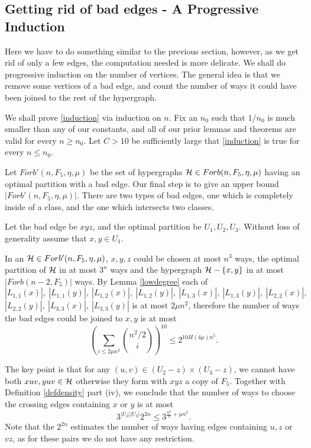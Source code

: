 \documentclass[11pt]{article}
\begin{document}
\subsection{Getting rid of bad edges - A Progressive Induction}

Here we have to do something similar to  the previous section,
however, as we get rid of only a few edges, the computation needed
is more delicate. We shall do progressive induction on the number of
vertices. The general idea is that we remove some vertices of a bad
edge, and count the number of ways it could
 have been joined to the rest of the hypergraph.

 We shall prove \eqref{induction} via induction on $n$. Fix an $n_0$
such that $1/n_0$ is much smaller than any of our constants, and all
of our prior lemmas and theorems are valid for every $n\ge n_0$. Let $C>10$ be
sufficiently large that \eqref{induction} is true for every $n\le
n_0$.


Let $Forb'(n, F_5, \eta, \mu)$ be the set of hypergraphs $\mathcal{H} \in
Forb(n,F_5,\eta,\mu)$ having an optimal partition with a bad edge.
Our  final step is to give an  upper bound $|Forb'(n, F_5, \eta,
\mu)|$. There are two types of bad edges, one which is completely
inside of a class, and the one which intersects two classes.

Let the bad edge be $xyz$, and the optimal partition be $U_1,U_2,U_3$.  Without loss of generality assume that
$x,y\in U_1$.

In an $\mathcal{H} \in Forb'(n,F_5,\eta,\mu)$, $x,y,z$ could be chosen at
most $n^3$ ways, the optimal partition of $\mathcal{H}$ in at most $3^n$ ways and
the hypergraph $\mathcal{H}-\{x,y\}$ in at most $|Forb(n-2,F_5)|$ ways. By Lemma \ref{lowdegree} each of $|L_{1,1}(x)|,\ |L_{1,1}(y)|,\
|L_{1,2}(x)|,\ |L_{1,2}(y)|,\ |L_{1,3}(x)|,\ |L_{1,3}(y)|,\
|L_{2,2}(x)|,$ $ |L_{2,2}(y)|,\ |L_{3,3}(x)|,\ |L_{3,3}(y)|$ is at most $2\mu
n^2$, therefore the number of ways the bad edges could be joined to
$x,y$ is at most
$$\left(\sum_{i\le 2\mu n^2}\binom{n^2/2}{i}\right)^{10}\le 2^{10 H(4\mu)n^2}.$$


The key point is that for any $(u,v)\in (U_2-z)\times (U_3-z)$,
we cannot have both $xuv,yuv\in \mathcal{H}$ otherwise they form with $xyz$ a
copy of $F_5$. Together with Definition \ref{defdensity} part (iv),
we conclude that the number of ways to choose the crossing edges containing $x$ or $y$ is at most
$$3^{|U_2||U_3|}2^{2n}\le 3^{\frac{n^2}{9}+\mu n^2}.$$
Note that the $2^{2n}$ estimates the number of ways having edges containing $u,z$ or $vz$, as for these pairs we do not have any restriction.
\end{document}
